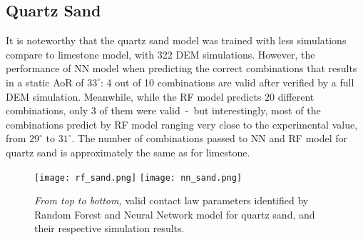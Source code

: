 \subsection{Quartz Sand}

It is noteworthy that the quartz sand model was trained with less simulations compare to limestone model, with 322 DEM simulations. However, the performance of NN model when predicting the correct combinations that results in a static AoR of $33^{\circ}$: 4 out of 10 combinations are valid after verified by a full DEM simulation. Meanwhile, while the RF model predicts 20 different combinations, only 3 of them were valid~-~but interestingly, most of the combinations predict by RF model ranging very close to the experimental value, from  $29^{\circ}$ to  $31^{\circ}$. The number of combinations passed to NN and RF model for quartz sand is approximately the same as for limestone. 

\begin{figure}[H]
    \centering
    \texttt{[image: rf\_sand.png]}
    \texttt{[image: nn\_sand.png]}
    \caption{\textit{From top to bottom,} valid contact law parameters identified by Random Forest and Neural Network model for quartz sand, and their respective simulation results.}\label{fig:SandNNRF}
\end{figure}

\begin{table}[H]
    \centering
    \caption{Valid contact law parameters identified by the NN model for quartz sand and their respective simulation results.}\label{table:sandNN}
\end{table}

